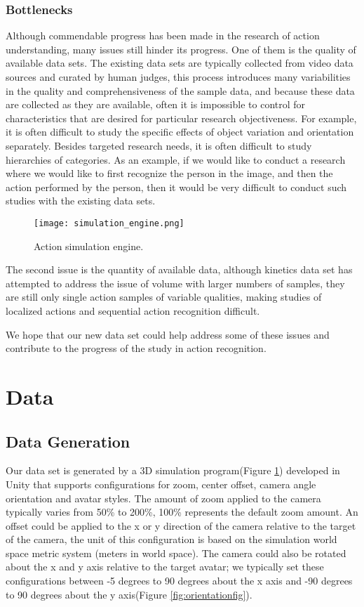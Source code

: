 \documentclass[
	a4paper, %
	10pt, %
	unnumberedsections, %
	twoside, %
]{t0004}
\begin{document}
\subsubsection{Bottlenecks} Although commendable progress has been made in the research of action understanding, many issues still hinder its progress. One of them is the quality of available data sets. The existing data sets are typically collected from video data sources and curated by human judges, this process introduces many variabilities in the quality and comprehensiveness of the sample data, and because these data are collected as they are available, often it is impossible to control for characteristics that are desired for particular research objectiveness. For example, it is often difficult to study the specific effects of object variation and orientation separately. Besides targeted research needs, it is often difficult to study hierarchies of categories. As an example, if we would like to conduct a research where we would like to first recognize the person in the image, and then the action performed by the person, then it would be very difficult to conduct such studies with the existing data sets.

\begin{figure}
	\texttt{[image: simulation\_engine.png]}
	\caption{Action simulation engine.}
	\label{fig:simulationengine}
\end{figure}

The second issue is the quantity of available data, although kinetics data set has attempted to address the issue of volume with larger numbers of samples, they are still only single action samples of variable qualities, making studies of localized actions and sequential action recognition difficult.

We hope that our new data set could help address some of these issues and contribute to the progress of the study in action recognition.

\section{Data}

\subsection{Data Generation}

Our data set is generated by a 3D simulation program(Figure \ref{fig:simulationengine}) developed in Unity that supports configurations for zoom, center offset, camera angle orientation and avatar styles. The amount of zoom applied to the camera typically varies from 50\% to 200\%, 100\% represents the default zoom amount. An offset could be applied to the x or y direction of the camera relative to the target of the camera, the unit of this configuration is based on the simulation world space metric system (meters in world space). The camera could also be rotated about the x and y axis relative to the target avatar; we typically set these configurations between -5 degrees to 90 degrees about the x axis and -90 degrees to 90 degrees about the y axis(Figure \ref{fig:orientationfig}).
\end{document}
